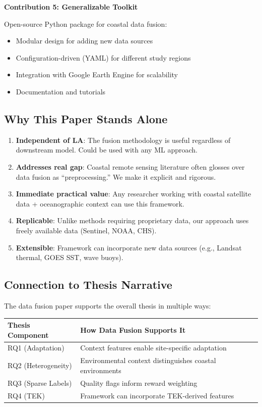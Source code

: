 \documentclass[11pt]{article}
\begin{document}
\textbf{Contribution 5: Generalizable Toolkit}

Open-source Python package for coastal data fusion:
\begin{itemize}
    \item Modular design for adding new data sources
    \item Configuration-driven (YAML) for different study regions
    \item Integration with Google Earth Engine for scalability
    \item Documentation and tutorials
\end{itemize}

\subsection{Why This Paper Stands Alone}

\begin{enumerate}
    \item \textbf{Independent of LA}: The fusion methodology is useful regardless of downstream model. Could be used with any ML approach.

    \item \textbf{Addresses real gap}: Coastal remote sensing literature often glosses over data fusion as ``preprocessing.'' We make it explicit and rigorous.

    \item \textbf{Immediate practical value}: Any researcher working with coastal satellite data + oceanographic context can use this framework.

    \item \textbf{Replicable}: Unlike methods requiring proprietary data, our approach uses freely available data (Sentinel, NOAA, CHS).

    \item \textbf{Extensible}: Framework can incorporate new data sources (e.g., Landsat thermal, GOES SST, wave buoys).
\end{enumerate}

\subsection{Connection to Thesis Narrative}

The data fusion paper supports the overall thesis in multiple ways:

\begin{center}
\begin{tabular}{ll}
\toprule
\textbf{Thesis Component} & \textbf{How Data Fusion Supports It} \\
\midrule
RQ1 (Adaptation) & Context features enable site-specific adaptation \\
RQ2 (Heterogeneity) & Environmental context distinguishes coastal environments \\
RQ3 (Sparse Labels) & Quality flags inform reward weighting \\
RQ4 (TEK) & Framework can incorporate TEK-derived features \\
\bottomrule
\end{tabular}
\end{center}
\end{document}
